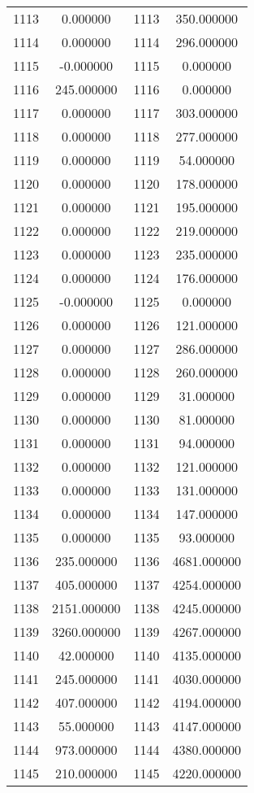 \documentclass[12pt]{article}
\begin{document}
\begin{longtable}{@{}cccc@{}}
1113 & 0.000000 & 1113 & 350.000000 \\
1114 & 0.000000 & 1114 & 296.000000 \\
1115 & -0.000000 & 1115 & 0.000000 \\
1116 & 245.000000 & 1116 & 0.000000 \\
1117 & 0.000000 & 1117 & 303.000000 \\
1118 & 0.000000 & 1118 & 277.000000 \\
1119 & 0.000000 & 1119 & 54.000000 \\
1120 & 0.000000 & 1120 & 178.000000 \\
1121 & 0.000000 & 1121 & 195.000000 \\
1122 & 0.000000 & 1122 & 219.000000 \\
1123 & 0.000000 & 1123 & 235.000000 \\
1124 & 0.000000 & 1124 & 176.000000 \\
1125 & -0.000000 & 1125 & 0.000000 \\
1126 & 0.000000 & 1126 & 121.000000 \\
1127 & 0.000000 & 1127 & 286.000000 \\
1128 & 0.000000 & 1128 & 260.000000 \\
1129 & 0.000000 & 1129 & 31.000000 \\
1130 & 0.000000 & 1130 & 81.000000 \\
1131 & 0.000000 & 1131 & 94.000000 \\
1132 & 0.000000 & 1132 & 121.000000 \\
1133 & 0.000000 & 1133 & 131.000000 \\
1134 & 0.000000 & 1134 & 147.000000 \\
1135 & 0.000000 & 1135 & 93.000000 \\
1136 & 235.000000 & 1136 & 4681.000000 \\
1137 & 405.000000 & 1137 & 4254.000000 \\
1138 & 2151.000000 & 1138 & 4245.000000 \\
1139 & 3260.000000 & 1139 & 4267.000000 \\
1140 & 42.000000 & 1140 & 4135.000000 \\
1141 & 245.000000 & 1141 & 4030.000000 \\
1142 & 407.000000 & 1142 & 4194.000000 \\
1143 & 55.000000 & 1143 & 4147.000000 \\
1144 & 973.000000 & 1144 & 4380.000000 \\
1145 & 210.000000 & 1145 & 4220.000000 \\

\end{longtable}
\end{document}
